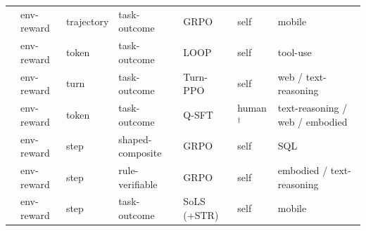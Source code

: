 \begin{table}[htbp]
{\begin{tabular}{@{}lllllll@{}}
\cite{Gu26b}   & env-reward & trajectory & task-outcome       & GRPO                                & self          & mobile                                \\
\cite{Che25af} & env-reward & token      & task-outcome       & LOOP                                & self          & tool-use                              \\
\cite{Li25ae}  & env-reward & turn       & task-outcome       & Turn-PPO                            & self          & web / text-reasoning                  \\
\cite{Hon24}   & env-reward & token      & task-outcome       & Q-SFT                               & human$^\dagger$ & text-reasoning / web / embodied     \\
\cite{Li26r}   & env-reward & step       & shaped-composite   & GRPO                                & self          & SQL                                   \\
\cite{Zha25ao} & env-reward & step       & rule-verifiable    & GRPO                                & self          & embodied / text-reasoning             \\
\cite{Pap25c}  & env-reward & step       & task-outcome       & SoLS (+STR)                         & self          & mobile                                \\
\bottomrule
\end{tabular}%
}
\end{table}